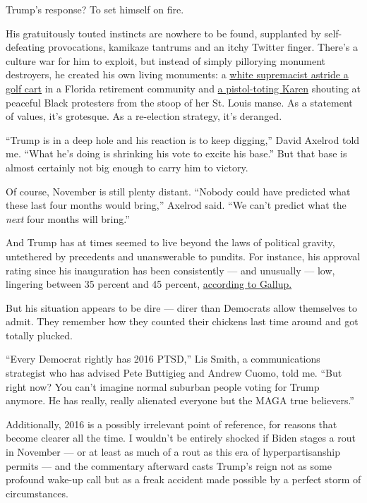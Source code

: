 Trump's response? To set himself on fire.

His gratuitously touted instincts are nowhere to be found, supplanted by
self-defeating provocations, kamikaze tantrums and an itchy Twitter
finger. There's a culture war for him to exploit, but instead of simply
pillorying monument destroyers, he created his own living monuments: a
\href{https://www.nytimes.com/2020/06/28/us/politics/trump-white-power-video-racism.html}{white
supremacist astride a golf cart} in a Florida retirement community and
\href{https://www.nytimes.com/2020/06/29/us/politics/trump-white-couple-protesters.html}{a
pistol-toting Karen} shouting at peaceful Black protesters from the
stoop of her St. Louis manse. As a statement of values, it's grotesque.
As a re-election strategy, it's deranged.

``Trump is in a deep hole and his reaction is to keep digging,'' David
Axelrod told me. ``What he's doing is shrinking his vote to excite his
base.'' But that base is almost certainly not big enough to carry him to
victory.

Of course, November is still plenty distant. ``Nobody could have
predicted what these last four months would bring,'' Axelrod said. ``We
can't predict what the \emph{next} four months will bring.''

And Trump has at times seemed to live beyond the laws of political
gravity, untethered by precedents and unanswerable to pundits. For
instance, his approval rating since his inauguration has been
consistently --- and unusually --- low, lingering between 35 percent and
45 percent,
\href{https://news.gallup.com/poll/203207/trump-job-approval-weekly.aspx}{according
to Gallup.}

But his situation appears to be dire --- direr than Democrats allow
themselves to admit. They remember how they counted their chickens last
time around and got totally plucked.

``Every Democrat rightly has 2016 PTSD,'' Lis Smith, a communications
strategist who has advised Pete Buttigieg and Andrew Cuomo, told me.
``But right now? You can't imagine normal suburban people voting for
Trump anymore. He has really, really alienated everyone but the MAGA
true believers.''

Additionally, 2016 is a possibly irrelevant point of reference, for
reasons that become clearer all the time. I wouldn't be entirely shocked
if Biden stages a rout in November --- or at least as much of a rout as
this era of hyperpartisanship permits --- and the commentary afterward
casts Trump's reign not as some profound wake-up call but as a freak
accident made possible by a perfect storm of circumstances.

